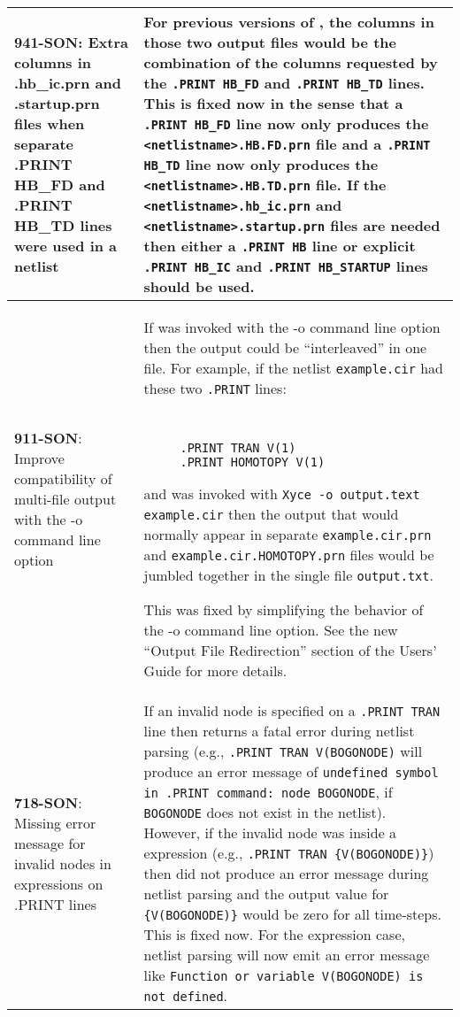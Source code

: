 {\begin{longtable}[h] {>{\raggedright\small}m{2in}|>{\raggedright\let\\\tabularnewline\small}m{3.5in}}
     \textbf{941-SON}: Extra columns in .hb\_ic.prn and .startup.prn 
     files when separate .PRINT HB\_FD and .PRINT HB\_TD lines were 
     used in a netlist &  For previous versions of \Xyce{}, the columns 
     in those two output files would be the combination of the columns 
     requested by the \texttt{.PRINT HB\_FD} and \texttt{.PRINT HB\_TD} 
     lines.  This is fixed now in the sense that a \texttt{.PRINT HB\_FD} 
     line now only produces the \texttt{<netlistname>.HB.FD.prn} file and 
     a \texttt{.PRINT HB\_TD} line now only produces the 
     \texttt{<netlistname>.HB.TD.prn} file.  If the 
     \texttt{<netlistname>.hb\_ic.prn} and \texttt{<netlistname>.startup.prn} 
     files are needed then either a \texttt{.PRINT HB} line or explicit 
     \texttt{.PRINT HB\_IC} and \texttt{.PRINT HB\_STARTUP} lines should 
     be used. \\ \hline

     \textbf{911-SON}: Improve compatibility of multi-file output with 
     the -o command line option & If \Xyce{} was invoked with the -o command line
     option then the output could be ``interleaved'' in one file.  For example, 
     if the netlist \texttt{example.cir} had these two \texttt{.PRINT} lines: 
     {\tt
     \begin{verbatim}
     .PRINT TRAN V(1)
     .PRINT HOMOTOPY V(1)
     \end{verbatim}
     }
     and was invoked with \texttt{Xyce -o output.text example.cir} then the
     output that would normally appear in separate \texttt{example.cir.prn}
     and \texttt{example.cir.HOMOTOPY.prn} files would be jumbled together
     in the single file \texttt{output.txt}.  

     This was fixed by simplifying the behavior of the -o command line
     option.  See the new ``Output File Redirection'' section of the
     \Xyce{} Users' Guide for more details. \\ \hline

     \textbf{718-SON}: Missing error message for invalid nodes in expressions 
     on .PRINT lines & If an invalid node is specified on a \Xyce{} 
     \texttt{.PRINT TRAN} line then \Xyce{} returns a fatal error
     during netlist parsing (e.g., \texttt{.PRINT TRAN V(BOGONODE)}
     will produce an error message of \texttt{undefined symbol in .PRINT
     command: node BOGONODE}, if \texttt{BOGONODE} does not exist in the
     netlist).  However, if the invalid node was inside a \Xyce{} expression
     (e.g., \texttt{.PRINT TRAN \{V(BOGONODE)\}}) then \Xyce{} did not
     produce an error message during netlist parsing and the output value
     for \texttt{\{V(BOGONODE)\}} would be zero for all time-steps.  This
     is fixed now.  For the expression case, \Xyce{} netlist parsing will 
     now emit an error message like \texttt{Function or variable V(BOGONODE) 
     is not defined}.  \\ \hline


\end{longtable}}
